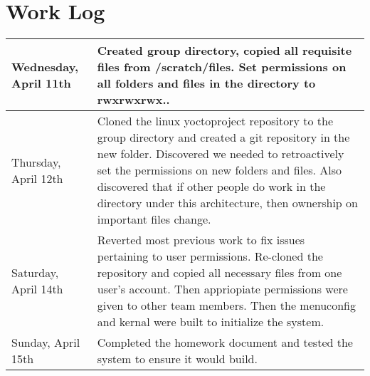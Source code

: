 \documentclass[10pt,draftclsnofoot,onecolumn]{IEEEtran}
\begin{document}
    \section{Work Log}
    	\begin{center}
        \begin{tabular}{ | p{4cm} | p{10cm} | }
        \hline
        Wednesday, April 11th & Created group directory, copied all requisite files from /scratch/files. Set permissions on all folders and files in the directory to rwxrwxrwx..\\ \hline
        Thursday, April 12th & Cloned the linux yoctoproject repository to the group directory and created a git repository in the new folder. Discovered we needed to retroactively set the permissions on new folders and files. Also discovered that if other people do work in the directory under this architecture, then ownership on important files change.\\ \hline
        Saturday, April 14th & Reverted most previous work to fix issues pertaining to user permissions. Re-cloned the repository and copied all necessary files from one user's account. Then appriopiate permissions were given to other team members. Then the menuconfig and kernal were built to initialize the system.\\ \hline
        Sunday, April 15th & Completed the homework document and tested the system to ensure it would build.\\ \hline
        \end{tabular}
    \end{center}
\nocite{*}

\end{document}
